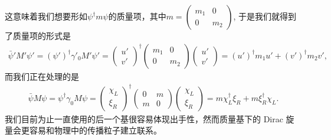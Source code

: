 这意味着我们想要形如$\psi^\dagger m\psi$的质量项，其中$m=\begin{pmatrix}m_1&0\\0&m_2\end{pmatrix}$,
于是我们就得到了质量项的形式是
\begin{align}
  \bar{\psi}'M'\psi'=(\psi')^\dagger%
  \gamma'_0M'\psi'=\begin{pmatrix}u'\\v'\end{pmatrix}^\dagger\begin{pmatrix}m_1&0\\0&m_2\end{pmatrix}
  \begin{pmatrix}u'\\v'\end{pmatrix}=(u')^\dagger m_1u'+(v')^\dagger m_2v',
\end{align}
而我们正在处理的是
\begin{align}
  \bar{\psi}M\psi=\psi^\dagger\gamma_0M\psi=\begin{pmatrix}\chi_L\\\xi_R\end{pmatrix}^\dagger\begin{pmatrix}0&m\\m&0\end{pmatrix}
  \begin{pmatrix}\chi_L\\\xi_R\end{pmatrix}=m\chi_L^\dagger\xi_R+m\xi_R^\dagger\chi_L.
\end{align}
我们目前为止一直使用的后一个基很容易体现出手性，然而质量基下的 Dirac 旋量会更容易和物理中的传播粒子建立联系。

